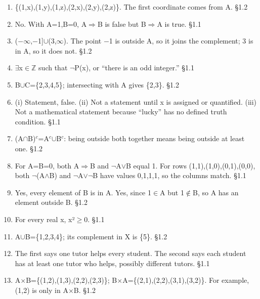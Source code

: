 \documentclass[11pt]{article}
\begin{document}
\begin{keepsection}
\begin{enumerate}
\item \{(1,x),(1,y),(1,z),(2,x),(2,y),(2,z)\}. The first coordinate comes from A. \hfill{\small\color{FAUblue}§1.2}
\item No. With A=1,B=0, A\ensuremath{\Rightarrow}B is false but B\ensuremath{\Rightarrow}A is true. \hfill{\small\color{FAUblue}§1.1}
\item (\ensuremath{-}\ensuremath{\infty},\ensuremath{-}1]\ensuremath{\cup}(3,\ensuremath{\infty}). The point \ensuremath{-}1 is outside A, so it joins the complement; 3 is in A, so it does not. \hfill{\small\color{FAUblue}§1.2}
\item \ensuremath{\exists}x\ensuremath{\in}\ensuremath{\mathbb{Z}} such that \ensuremath{\neg}P(x), or “there is an odd integer.” \hfill{\small\color{FAUblue}§1.1}
\item B\ensuremath{\cup}C=\{2,3,4,5\}; intersecting with A gives \{2,3\}. \hfill{\small\color{FAUblue}§1.2}
\item (i) Statement, false. (ii) Not a statement until x is assigned or quantified. (iii) Not a mathematical statement because “lucky” has no defined truth condition. \hfill{\small\color{FAUblue}§1.1}
\item (A\ensuremath{\cap}B)\ensuremath{^{c}}=A\ensuremath{^{c}}\ensuremath{\cup}B\ensuremath{^{c}}: being outside both together means being outside at least one. \hfill{\small\color{FAUblue}§1.2}
\item For A=B=0, both A\ensuremath{\Rightarrow}B and \ensuremath{\neg}A\ensuremath{\lor}B equal 1. For rows (1,1),(1,0),(0,1),(0,0), both \ensuremath{\neg}(A\ensuremath{\land}B) and \ensuremath{\neg}A\ensuremath{\lor}\ensuremath{\neg}B have values 0,1,1,1, so the columns match. \hfill{\small\color{FAUblue}§1.1}
\item Yes, every element of B is in A. Yes, since 1\ensuremath{\in}A but 1\ensuremath{\notin}B, so A has an element outside B. \hfill{\small\color{FAUblue}§1.2}
\item For every real x, x²\ensuremath{\geq}0. \hfill{\small\color{FAUblue}§1.1}
\item A\ensuremath{\cup}B=\{1,2,3,4\}; its complement in X is \{5\}. \hfill{\small\color{FAUblue}§1.2}
\item The first says one tutor helps every student. The second says each student has at least one tutor who helps, possibly different tutors. \hfill{\small\color{FAUblue}§1.1}
\item A\ensuremath{\times}B=\{(1,2),(1,3),(2,2),(2,3)\}; B\ensuremath{\times}A=\{(2,1),(2,2),(3,1),(3,2)\}. For example, (1,2) is only in A\ensuremath{\times}B. \hfill{\small\color{FAUblue}§1.2}

\end{enumerate}
\end{keepsection}
\end{document}
